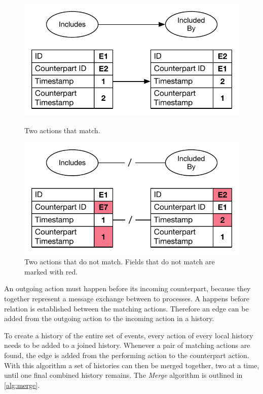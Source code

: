     \begin{figure}[H]
		\centering
		\begin{minipage}{0.45\textwidth}
			\centering
			\includegraphics[width=\textwidth]{4connect/images/actions-match.pdf}
		\caption{Two actions that match.}
		\label{fig:connect:actions-match}
		\end{minipage}\hfill
		\begin{minipage}{0.45\textwidth}
			\centering
			\includegraphics[width=\textwidth]{4connect/images/actions-do-not-match.pdf}
		\caption{Two actions that do not match. Fields that do not match are marked with red.}
		\label{fig:connect:actions-do-not-match}
		\end{minipage}
		\end{figure}
    
    \newpar An outgoing action must happen before its incoming counterpart, because they together represent a message exchange between to processes. A happens before relation is established between the matching actions. Therefore an edge can be added from the outgoing action to the incoming action in a history.

	\newpar To create a history of the entire set of events, every action of every local history needs to be added to a joined history. Whenever a pair of matching actions are found, the edge is added from the performing action to the counterpart action. With this algorithm a set of histories can then be merged together, two at a time, until one final combined history remains. The \textit{Merge} algorithm is outlined in \autoref{alg:merge}.
	
